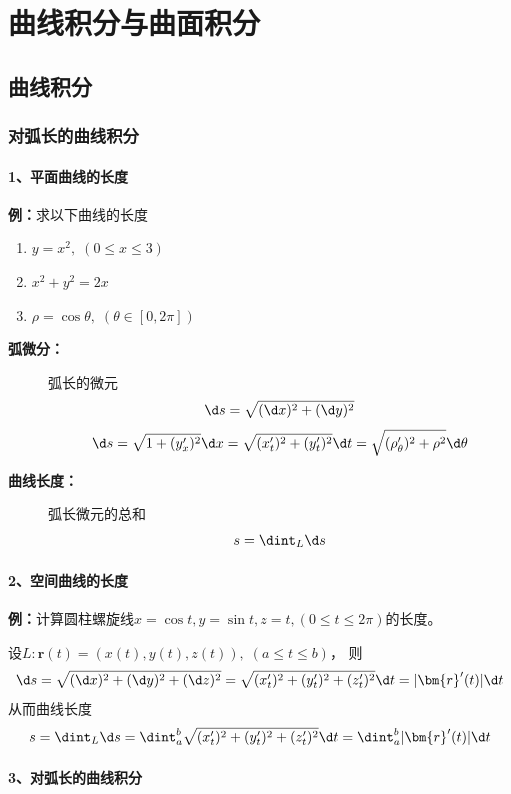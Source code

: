 \setcounter{chapter}{11}

\chapter{曲线积分与曲面积分}

\section{曲线积分}

\subsection{对弧长的曲线积分}

\subsubsection{1、平面曲线的长度}

{\bf 例：}求以下曲线的长度
\begin{enumerate}[(1)]
  \setlength{\itemindent}{1cm}
  \item $y=x^2,\;(0\leq x\leq 3)$
  \item $x^2+y^2=2x$
  \item $\rho=\cos\theta,\;(\theta\in[0,2\pi])$
\end{enumerate}

\begin{description}
\item[{\bf 弧微分：}] 弧长的微元
	$$\d s=\sqrt{(\d x)^2+(\d y)^2}$$
	$$\d s=\sqrt{1+(y'_x)^2}\d x=\sqrt{(x'_t)^2+(y'_t)^2}\d t
	=\sqrt{(\rho'_{\theta})^2+\rho^2}\d\theta$$
\item[{\bf 曲线长度：}] 弧长微元的总和
	$$s=\dint_L\d s$$
\end{description}

\subsubsection{2、空间曲线的长度}

{\bf 例：}计算圆柱螺旋线$x=\cos t,y=\sin t,z=t,(0\leq t\leq 2\pi)$的长度。

设$L:\bm{r}(t)=(x(t),y(t),z(t)),\;(a\leq t\leq b)$， 则
$${\d s=\sqrt{(\d x)^2+(\d y)^2+(\d z)^2}
=\sqrt{(x'_t)^2+(y'_t)^2+(z'_t)^2}\d t} =|\bm{r}'(t)|\d t$$
从而曲线长度
$${s=\dint_L\d s =\dint_a^b\sqrt{(x'_t)^2+(y'_t)^2+(z'_t)^2}\d t
 =\dint_a^b|\bm{r}'(t)|\d t}$$

\subsubsection{3、对弧长的曲线积分}

